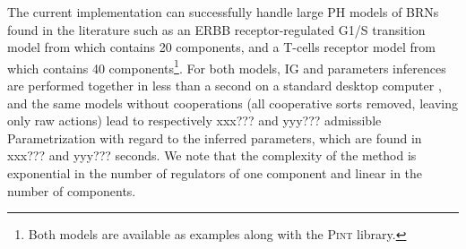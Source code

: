 The current implementation can successfully handle large PH models of BRNs found in the literature
such as an ERBB receptor-regulated G1/S transition model from \cite{Sahin09} which contains 20
components, and a T-cells receptor model from \cite{Klamt06} which contains 40
components\footnote{Both models are available as examples along with the \textsc{Pint} library.}.
For both models, IG and parameters inferences are performed together in less than a second on a
standard desktop computer%
, and the same models without cooperations
(all cooperative sorts removed, leaving only raw actions) lead to
respectively xxx??? and yyy??? admissible Parametrization with regard to the inferred parameters,
which are found in xxx??? and yyy??? seconds.
We note that the complexity of the method is exponential in the number of regulators of one
component and linear in the number of components.
